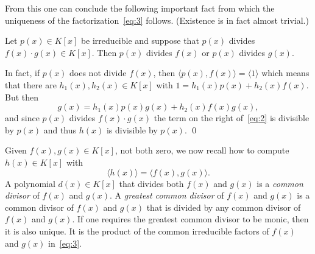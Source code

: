 From this one can conclude the following important fact from which the uniqueness of the factorization~\eqref{eq:3} follows. (Existence is in fact almost trivial.)
\begin{theorem}
  \label{thr:9}
  Let $p(x) ∈K[x]$ be irreducible and suppose that $p(x)$ divides $f(x) ⋅ g(x) ∈ K[x]$. Then $p(x)$ divides $f(x)$ or $p(x)$ divides $g(x)$. 
\end{theorem}
{\small \noindent 
  In fact, if $p(x)$ does not divide $f(x)$, then $〈p(x),f(x)〉 = 〈1〉$ which means that there are $h_1(x), h_2(x) ∈ K[x]$ with $1 = h_1(x) p(x) + h_2(x) f(x)$. But then
  \begin{equation}
    \label{eq:2}
    g(x) = h_1(x) p(x)  g(x)+ h_2(x) f(x) g(x),
  \end{equation}
  and since $p(x)$ divides $f(x) ⋅g(x)$ the term on the right of~\eqref{eq:2} is divisible by $p(x)$ and thus $h(x)$ is divisible by $p(x)$. \qed
  
}


Given $f(x),g(x) ∈K[x]$, not both zero, we now recall how to compute $h(x) ∈ K[x]$ with
\begin{displaymath}
  〈h(x) 〉 = 〈 f(x),g(x) 〉. 
\end{displaymath}
A polynomial $d(x) ∈K[x]$ that divides both $f(x)$ and $g(x)$ is a \emph{common divisor} of $f(x)$ and $g(x)$. A \emph{greatest common divisor} of $f(x)$ and $g(x)$ is a common divisor of $f(x)$ and $g(x)$ that is divided by any common divisor of $f(x)$ and $g(x)$.  If one requires the greatest common divisor to be monic, then it is also unique. It is the product of the common irreducible factors of $f(x)$ and $g(x)$ in~\eqref{eq:3}.

